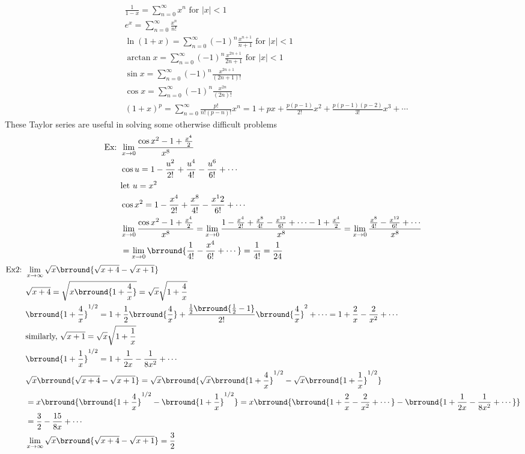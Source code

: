 \begin{align*}
    &\frac{1}{1-x}=\sum_{n=0}^\infty x^n\text{ for $|x|<1$}\\
    &e^x=\sum_{n=0}^\infty\frac{x^n}{n!}\\
    &\ln(1+x)=\sum_{n=0}^\infty(-1)^n\frac{x^{n+1}}{n+1}\text{ for $|x|<1$}\\
    &\arctan x=\sum_{n=0}^\infty(-1)^n\frac{x^{2n+1}}{2n+1}\text{ for $|x|<1$}\\
    &\sin x=\sum_{n=0}^\infty(-1)^n\frac{x^{2n+1}}{(2n+1)!}\\
    &\cos x=\sum_{n=0}^\infty(-1)^n\frac{x^{2n}}{(2n)!}\\
    &(1+x)^p=\sum_{n=0}^\infty\frac{p!}{n!(p-n)!}x^n=1+px+\frac{p(p-1)}{2!}x^2+\frac{p(p-1)(p-2)}{3!}x^3+\cdots
\end{align*}
These Taylor series are useful in solving some otherwise difficult problems
\begin{align*}
    \text{Ex: }&\lim_{x\to0}\frac{\cos x^2-1+\frac{x^4}{2}}{x^8}\\
    &\cos u=1-\frac{u^2}{2!}+\frac{u^4}{4!}-\frac{u^6}{6!}+\cdots\\
    &\text{let }u=x^2\\
    &\cos x^2=1-\frac{x^4}{2!}+\frac{x^8}{4!}-\frac{x^12}{6!}+\cdots\\
    &\lim_{x\to0}\frac{\cos x^2-1+\frac{x^4}{2}}{x^8}=\lim_{x\to0}\frac{1-\frac{x^4}{2!}+\frac{x^8}{4!}-\frac{x^{12}}{6!}+\cdots-1+\frac{x^4}{2}}{x^8}=\lim_{x\to0}\frac{\frac{x^8}{4!}-\frac{x^{12}}{6!}+\cdots}{x^8}\\
    &=\lim_{x\to0}\brround{\frac{1}{4!}-\frac{x^4}{6!}+\cdots}=\frac{1}{4!}=\frac{1}{24}
\end{align*}
\begin{align*}
    \text{Ex2: }&\lim_{x\to\infty}\sqrt{x}\brround{\sqrt{x+4}-\sqrt{x+1}}\\
    &\sqrt{x+4}=\sqrt{x\brround{1+\frac{4}{x}}}=\sqrt{x}\sqrt{1+\frac{4}{x}}\\
    &\brround{1+\frac{4}{x}}^{1/2}=1+\frac{1}{2}\brround{\frac{4}{x}}+\frac{\frac{1}{2}\brround{\frac{1}{2}-1}}{2!}\brround{\frac{4}{x}}^2+\cdots=1+\frac{2}{x}-\frac{2}{x^2}+\cdots\\
    &\text{similarly, }\sqrt{x+1}=\sqrt{x}\sqrt{1+\frac{1}{x}}\\
    &\brround{1+\frac{1}{x}}^{1/2}=1+\frac{1}{2x}-\frac{1}{8x^2}+\cdots\\
    &\sqrt{x}\brround{\sqrt{x+4}-\sqrt{x+1}}=\sqrt{x}\brround{\sqrt{x}\brround{1+\frac{4}{x}}^{1/2}-\sqrt{x}\brround{1+\frac{1}{x}}^{1/2}}\\
    &=x\brround{\brround{1+\frac{4}{x}}^{1/2}-\brround{1+\frac{1}{x}}^{1/2}}=x\brround{\brround{1+\frac{2}{x}-\frac{2}{x^2}+\cdots}-\brround{1+\frac{1}{2x}-\frac{1}{8x^2}+\cdots}}\\&=\frac{3}{2}-\frac{15}{8x}+\cdots\\
    &\lim_{x\to\infty}\sqrt{x}\brround{\sqrt{x+4}-\sqrt{x+1}}=\frac{3}{2}
\end{align*}